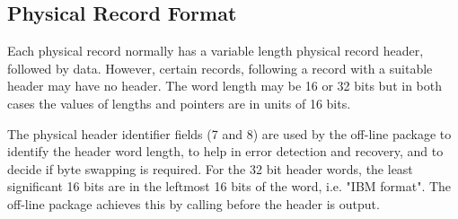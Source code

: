  
\subsection*{Physical Record Format}
 
Each physical record normally has a variable length physical record
header, followed by data. However, certain records, following a record
with a suitable header may have no header.
The word length may be 16 or 32 bits but in both cases the values of
lengths and pointers are in units of 16 bits.
 
The physical header identifier fields (7 and 8) are used by
the off-line package to identify the header word length, to help in
error detection and recovery, and to decide if byte swapping is
required. For the 32 bit
header words, the least significant 16 bits are in the leftmost 16 bits
of the word, i.e. "IBM format". The off-line package achieves this by
calling  before the header is output.
 
\newpage


